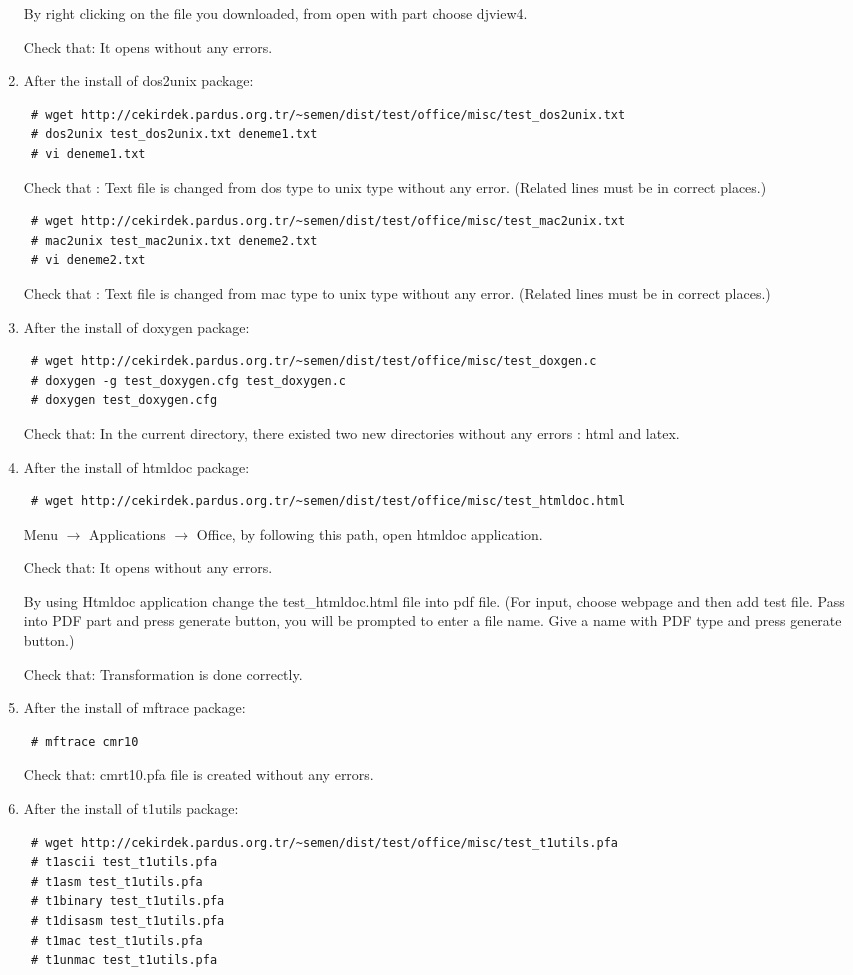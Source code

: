 \documentclass[a4paper,10pt]{article}
\begin{document}
\begin{enumerate}
By right clicking on the file you downloaded, from open with part choose djview4. 

Check that: It opens without any errors.

\item After the install of dos2unix package:
\begin{verbatim}
 # wget http://cekirdek.pardus.org.tr/~semen/dist/test/office/misc/test_dos2unix.txt
 # dos2unix test_dos2unix.txt deneme1.txt
 # vi deneme1.txt
\end{verbatim}
Check that : Text file is changed from dos type to unix type without any error. (Related lines must be in  correct places.)

\begin{verbatim}
 # wget http://cekirdek.pardus.org.tr/~semen/dist/test/office/misc/test_mac2unix.txt
 # mac2unix test_mac2unix.txt deneme2.txt
 # vi deneme2.txt
\end{verbatim}
Check that : Text file is changed from mac type to unix type without any error. (Related lines must be in  correct places.)

\item After the install of doxygen package:
\begin{verbatim}
 # wget http://cekirdek.pardus.org.tr/~semen/dist/test/office/misc/test_doxgen.c
 # doxygen -g test_doxygen.cfg test_doxygen.c
 # doxygen test_doxygen.cfg
\end{verbatim}

Check that: In the current directory, there existed two new directories without any errors : html and latex.

\item After the install of htmldoc package:
\begin{verbatim}
 # wget http://cekirdek.pardus.org.tr/~semen/dist/test/office/misc/test_htmldoc.html
\end{verbatim}

Menu $\rightarrow$ Applications $\rightarrow$ Office, by following this path, open htmldoc application.

Check that: It opens without any errors.

By using Htmldoc application change the test\_htmldoc.html file into pdf file. (For input, choose webpage and then add test file. Pass into PDF part and press generate button, you will be prompted to enter a file name. Give a name with PDF type and press generate button.)
 
Check that: Transformation is done correctly.
\item After the install of mftrace package:
\begin{verbatim}
 # mftrace cmr10
\end{verbatim}
Check that: cmrt10.pfa file is created without any errors.
\item After the install of t1utils package:
\begin{verbatim}
 # wget http://cekirdek.pardus.org.tr/~semen/dist/test/office/misc/test_t1utils.pfa
 # t1ascii test_t1utils.pfa
 # t1asm test_t1utils.pfa
 # t1binary test_t1utils.pfa
 # t1disasm test_t1utils.pfa
 # t1mac test_t1utils.pfa
 # t1unmac test_t1utils.pfa
\end{verbatim}


\end{enumerate}
\end{document}
